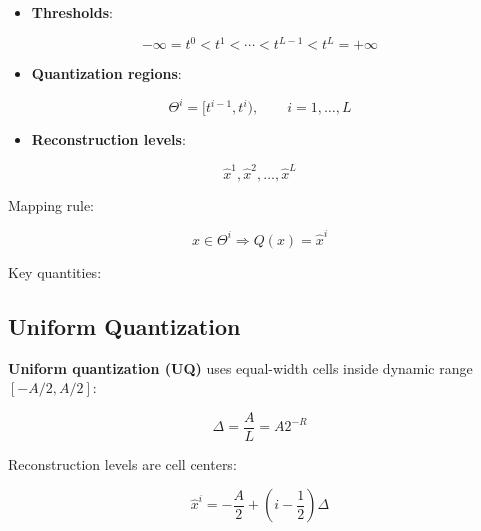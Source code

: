 \begin{itemize}
  \item \textbf{Thresholds}:
\end{itemize}

\[
-\infty=t^0<t^1<\cdots<t^{L-1}<t^L=+\infty
\]

\begin{itemize}
  \item \textbf{Quantization regions}:
\end{itemize}

\[
\Theta^i=[t^{i-1},t^i), \qquad i=1,\ldots,L
\]

\begin{itemize}
  \item \textbf{Reconstruction levels}:
\end{itemize}

\[
\hat{x}^1,\hat{x}^2,\ldots,\hat{x}^L
\]

Mapping rule:

\[
x\in\Theta^i \Rightarrow Q(x)=\hat{x}^i
\]

Key quantities:

\begin{center}
\end{center}

\subsection{Uniform Quantization}

\textbf{Uniform quantization (UQ)} uses equal-width cells inside dynamic range $[-A/2,A/2]$:

\[
\Delta=\frac{A}{L}=A2^{-R}
\]

Reconstruction levels are cell centers:

\[
\hat{x}^i=-\frac{A}{2}+\left(i-\frac{1}{2}\right)\Delta
\]

